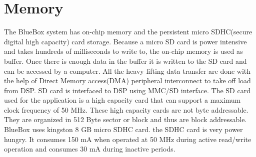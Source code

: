 \section{Memory}\label{memory}
The BlueBox system has on-chip memory and the persistent micro SDHC(secure digital high capacity) card storage. Because a micro SD card is power intensive and takes hundreds of milliseconds to write to, the on-chip memory is used as buffer. Once there is enough data in the buffer it is written to the SD card and can be accessed by a computer. All the heavy lifting data transfer are done with the help of Direct Memory access(DMA) peripheral interconnect to take off load from DSP. SD card is interfaced to DSP using MMC/SD interface. The SD card used for the application is a high capacity card that can support a maximum clock frequency of 50 MHz. These high capacity cards are not byte addressable. They are organized in 512 Byte sector or block and thus are block addressable. BlueBox uses kingston 8 GB micro SDHC card. the SDHC card is very power hungry. It consumes 150 mA when operated at 50 MHz during active read/write operation and consumes 30 mA during inactive periods.

